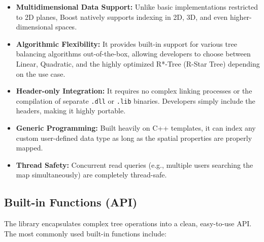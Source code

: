 \documentclass[a4paper, 10pt, titlepage]{report}
\begin{document}
\begin{itemize}
    \item \textbf{Multidimensional Data Support:} Unlike basic implementations restricted to 2D planes, Boost natively supports indexing in 2D, 3D, and even higher-dimensional spaces.
    \item \textbf{Algorithmic Flexibility:} It provides built-in support for various tree balancing algorithms out-of-the-box, allowing developers to choose between Linear, Quadratic, and the highly optimized R*-Tree (R-Star Tree) depending on the use case.
    \item \textbf{Header-only Integration:} It requires no complex linking processes or the compilation of separate \texttt{.dll} or \texttt{.lib} binaries. Developers simply include the headers, making it highly portable.
    \item \textbf{Generic Programming:} Built heavily on C++ templates, it can index any custom user-defined data type as long as the spatial properties are properly mapped.
    \item \textbf{Thread Safety:} Concurrent read queries (e.g., multiple users searching the map simultaneously) are completely thread-safe.
\end{itemize}

\subsection{Built-in Functions (API)}
The library encapsulates complex tree operations into a clean, easy-to-use API. The most commonly used built-in functions include:
\end{document}
